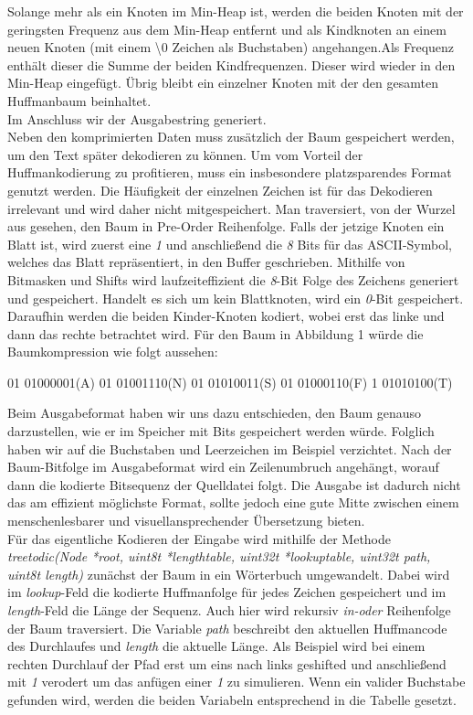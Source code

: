 \documentclass[course=erap]{aspdoc}
\begin{document}
Solange mehr als ein Knoten im Min-Heap ist, werden die beiden Knoten mit der geringsten Frequenz aus dem Min-Heap entfernt und als Kindknoten an einem neuen Knoten (mit einem \textbackslash 0 Zeichen als Buchstaben) angehangen.Als Frequenz enthält dieser die Summe der beiden Kindfrequenzen. Dieser wird wieder in den Min-Heap eingefügt.
Übrig bleibt ein einzelner Knoten mit der den gesamten Huffmanbaum beinhaltet.\\
Im Anschluss wir der Ausgabestring generiert.\\
Neben den komprimierten Daten muss zusätzlich der Baum gespeichert werden, um den Text später dekodieren zu können. Um vom Vorteil der Huffmankodierung zu profitieren, muss ein insbesondere platzsparendes Format genutzt werden. Die Häufigkeit der einzelnen Zeichen ist für das Dekodieren irrelevant und wird daher nicht mitgespeichert.
Man traversiert, von der Wurzel aus gesehen, den Baum in Pre-Order Reihenfolge. Falls der jetzige Knoten ein Blatt ist, wird zuerst eine \textit{1} und anschließend die \textit{8} Bits für das ASCII-Symbol, welches das Blatt repräsentiert, in den Buffer geschrieben. Mithilfe von Bitmasken und Shifts wird laufzeiteffizient die \textit{8}-Bit Folge des Zeichens generiert und gespeichert. Handelt es sich um kein Blattknoten, wird ein \textit{0}-Bit gespeichert. Daraufhin werden die beiden Kinder-Knoten kodiert, wobei erst das linke und dann das rechte betrachtet wird.
Für den Baum in Abbildung 1 würde die Baumkompression wie folgt aussehen:
\begin{center}
    01 01000001(A) 01 01001110(N) 01 01010011(S) 01 01000110(F) 1 01010100(T)
\end{center}
Beim Ausgabeformat haben wir uns dazu entschieden, den Baum genauso darzustellen, wie er im Speicher mit Bits gespeichert werden würde. Folglich haben wir auf die Buchstaben und Leerzeichen im Beispiel verzichtet. Nach der Baum-Bitfolge im Ausgabeformat wird ein Zeilenumbruch angehängt, worauf dann die kodierte Bitsequenz der Quelldatei folgt. Die Ausgabe ist dadurch nicht das am effizient möglichste Format, sollte jedoch eine gute Mitte zwischen einem menschenlesbarer und visuellansprechender Übersetzung bieten.\\
Für das eigentliche Kodieren der Eingabe wird mithilfe der Methode \textit{tree\textunderscore to\textunderscore dic(Node *root, uint8\textunderscore t *length\textunderscore table, uint32\textunderscore t *lookup\textunderscore table, uint32\textunderscore t path, uint8\textunderscore t length)} zunächst der Baum in ein Wörterbuch umgewandelt. Dabei wird im \textit{lookup}-Feld die kodierte Huffmanfolge für jedes Zeichen gespeichert und im \textit{length}-Feld die Länge der Sequenz. Auch hier wird rekursiv \textit{in-oder} Reihenfolge der Baum traversiert. Die Variable \textit{path} beschreibt den aktuellen Huffmancode des Durchlaufes und \textit{length} die aktuelle Länge. Als Beispiel wird bei einem rechten Durchlauf der Pfad erst um eins nach links geshifted und anschließend mit \textit{1} verodert um das anfügen einer \textit{1} zu simulieren. Wenn ein valider Buchstabe gefunden wird, werden die beiden Variabeln entsprechend in die Tabelle gesetzt.\\
\end{document}
